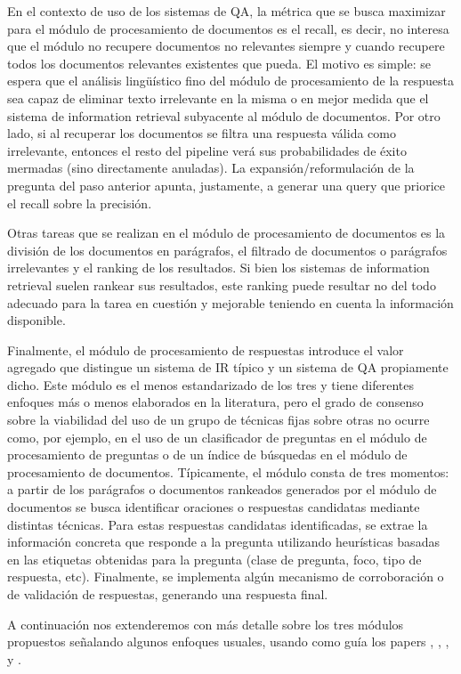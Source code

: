En el contexto de uso de los sistemas de QA, la métrica que se busca maximizar para el módulo de procesamiento de documentos es el recall, es decir, no interesa que el módulo no recupere documentos no relevantes siempre y cuando recupere todos los documentos relevantes existentes que pueda. El motivo es simple: se espera que el análisis lingüístico fino del módulo de procesamiento de la respuesta sea capaz de eliminar texto irrelevante en la misma o en mejor medida que el sistema de information retrieval subyacente al módulo de documentos. Por otro lado, si al recuperar los documentos se filtra una respuesta válida como irrelevante, entonces el resto del pipeline verá sus probabilidades de éxito mermadas (sino directamente anuladas).  La expansión/reformulación de la pregunta del paso anterior apunta, justamente, a generar una query que priorice el recall sobre la precisión.

Otras tareas que se realizan en el módulo de procesamiento de documentos es la división de los documentos en parágrafos, el filtrado de documentos o parágrafos irrelevantes y el ranking de los resultados. Si bien los sistemas de information retrieval suelen rankear sus resultados, este ranking puede resultar no del todo adecuado para la tarea en cuestión y mejorable teniendo en cuenta la información disponible.

Finalmente, el módulo de procesamiento de respuestas introduce el valor agregado que distingue un sistema de IR típico y un sistema de QA propiamente dicho. Este módulo es el menos estandarizado de los tres y tiene diferentes enfoques más o menos elaborados en la literatura, pero el grado de consenso sobre la viabilidad del uso de un grupo de técnicas fijas sobre otras no ocurre como, por ejemplo, en el uso de un clasificador de preguntas en el módulo de procesamiento de preguntas o de un índice de búsquedas en el módulo de procesamiento de documentos. Típicamente, el módulo consta de tres momentos:  a partir de los parágrafos o documentos rankeados generados por el módulo de documentos se busca identificar oraciones o respuestas candidatas mediante distintas técnicas. Para estas respuestas candidatas identificadas, se extrae la información concreta que responde a la pregunta utilizando heurísticas basadas en las etiquetas obtenidas para la pregunta (clase de pregunta, foco, tipo de respuesta, etc). Finalmente, se implementa algún mecanismo de corroboración o de validación de respuestas, generando una respuesta final.

A continuación nos extenderemos con más detalle sobre los tres módulos propuestos señalando algunos enfoques usuales, usando como guía los papers \cite{QA-survey}, \cite{QA1}, \cite{QA2}, \cite{QA3} y \cite{PASSAGE1}.

